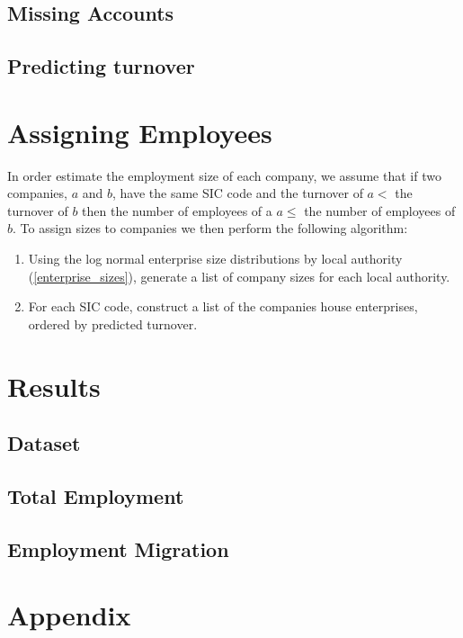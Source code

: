 \documentclass[a4paper,10pt]{article}
\begin{document}
\subsection{Missing Accounts}

\subsection{Predicting turnover}

\section{Assigning Employees}
In order estimate the employment size of each company, we assume that if two companies, $a$ and $b$, have the same SIC code and the turnover of $a < $ the turnover of $b$ then the number of employees of a $a \leq$ the number of employees of $b$. To assign sizes to companies we then perform the following algorithm:
\begin{enumerate}
 \item Using the log normal enterprise size distributions by local authority (\ref{enterprise_sizes}), generate a list of company sizes for each local authority.
 \item For each SIC code, construct a list of the companies house enterprises, ordered by predicted turnover.
\end{enumerate}


\section{Results}
\subsection{Dataset}
\subsection{Total Employment}
\subsection{Employment Migration}

\section{Appendix}
\end{document}
